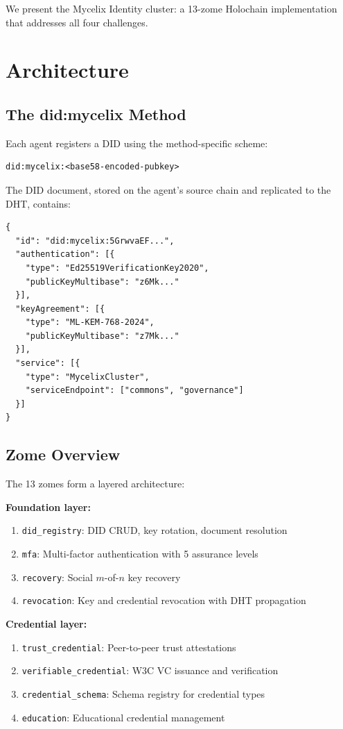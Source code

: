 \documentclass[11pt,twocolumn]{article}
\begin{document}
We present the Mycelix Identity cluster: a 13-zome Holochain implementation
that addresses all four challenges.

\section{Architecture}

\subsection{The did:mycelix Method}

Each agent registers a DID using the method-specific scheme:

\begin{lstlisting}[language={}]
did:mycelix:<base58-encoded-pubkey>
\end{lstlisting}

The DID document, stored on the agent's source chain and replicated to the
DHT, contains:

\begin{lstlisting}
{
  "id": "did:mycelix:5GrwvaEF...",
  "authentication": [{
    "type": "Ed25519VerificationKey2020",
    "publicKeyMultibase": "z6Mk..."
  }],
  "keyAgreement": [{
    "type": "ML-KEM-768-2024",
    "publicKeyMultibase": "z7Mk..."
  }],
  "service": [{
    "type": "MycelixCluster",
    "serviceEndpoint": ["commons", "governance"]
  }]
}
\end{lstlisting}

\subsection{Zome Overview}

The 13 zomes form a layered architecture:

\textbf{Foundation layer:}
\begin{enumerate}[nosep]
  \item \texttt{did\_registry}: DID CRUD, key rotation, document resolution
  \item \texttt{mfa}: Multi-factor authentication with 5 assurance levels
  \item \texttt{recovery}: Social $m$-of-$n$ key recovery
  \item \texttt{revocation}: Key and credential revocation with DHT propagation
\end{enumerate}

\textbf{Credential layer:}
\begin{enumerate}[nosep,start=5]
  \item \texttt{trust\_credential}: Peer-to-peer trust attestations
  \item \texttt{verifiable\_credential}: W3C VC issuance and verification
  \item \texttt{credential\_schema}: Schema registry for credential types
  \item \texttt{education}: Educational credential management
\end{enumerate}
\end{document}
